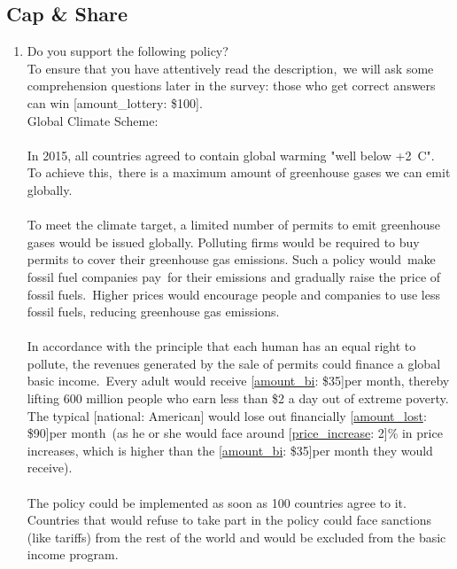 \documentclass[12pt,english]{article}
\begin{document}
\begin{bibunit}
 \subsection*{Cap \& Share} 
 \begin{enumerate}[resume] 
\item  \label{q:gcs_support} Do you support the following policy?\\
To ensure that you have attentively read the description,~we will ask some comprehension questions later in the survey: those who get correct answers can win [amount\_lottery: \$100].
~\\
Global Climate Scheme:~\\\\
In 2015, all countries agreed to contain global warming "well below +2~\textdegree{}C". To achieve this,~there is a maximum amount of greenhouse gases we can emit globally.~\\\\
To meet the climate target, a limited number of permits to emit greenhouse gases would be issued globally. Polluting firms would be required to buy permits to cover their greenhouse gas emissions. Such a policy would~make fossil fuel companies pay~for their emissions and gradually raise the price of fossil fuels.~Higher prices would encourage people and companies to use less fossil fuels, reducing greenhouse gas emissions.\\\\
In accordance with the principle that each human has an equal right to pollute, the revenues generated by the sale of permits could finance a global basic income.~Every adult would receive [\hyperlink{tab_features}{amount\_bi}: \$35]per month, thereby lifting 600 million people who earn less than \$2 a day out of extreme poverty.\\
The typical [national: American] would lose out financially [\hyperlink{tab_features}{amount\_lost}: \$90]per month~(as he or she would face around [\hyperlink{tab_features}{price\_increase}: 2]\% in price increases, which is higher than the [\hyperlink{tab_features}{amount\_bi}: \$35]per month they would receive).\\\\
The policy could be implemented as soon as 100 countries agree to it. Countries that would refuse to take part in the policy could face sanctions (like tariffs) from the rest of the world and would be excluded from the basic income program.\\\\

\end{enumerate}
\end{bibunit}
\end{document}
